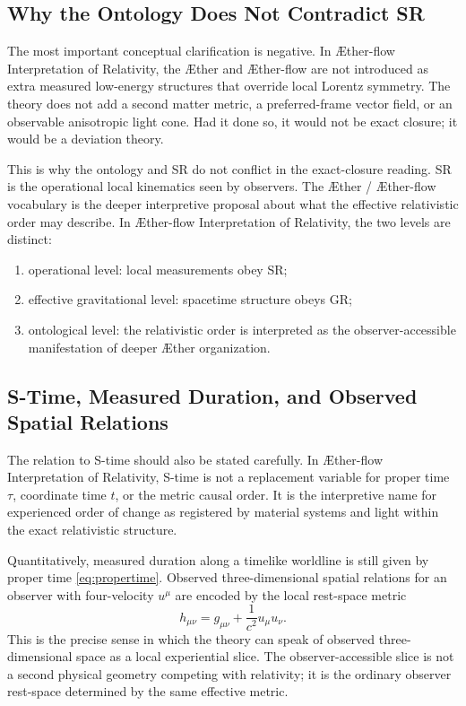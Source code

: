 \documentclass[11pt]{article}
\newcommand{\Aether}{\AE{}ther}
\newcommand{\Aflow}{\AE{}ther-flow}
\newcommand{\TheoryName}{\Aflow{} Interpretation of Relativity}
\begin{document}
\subsection{Why the Ontology Does Not Contradict SR}

The most important conceptual clarification is negative. In \TheoryName{}, the \Aether{} and \Aflow{} are not introduced as extra measured low-energy structures that override local Lorentz symmetry. The theory does not add a second matter metric, a preferred-frame vector field, or an observable anisotropic light cone. Had it done so, it would not be exact closure; it would be a deviation theory.

This is why the ontology and SR do not conflict in the exact-closure reading. SR is the operational local kinematics seen by observers. The \Aether{} / \Aflow{} vocabulary is the deeper interpretive proposal about what the effective relativistic order may describe. In \TheoryName{}, the two levels are distinct:
\begin{enumerate}
    \item operational level: local measurements obey SR;
    \item effective gravitational level: spacetime structure obeys GR;
    \item ontological level: the relativistic order is interpreted as the observer-accessible manifestation of deeper \Aether{} organization.
\end{enumerate}

\subsection{S-Time, Measured Duration, and Observed Spatial Relations}

The relation to S-time should also be stated carefully. In \TheoryName{}, S-time is not a replacement variable for proper time \(\tau\), coordinate time \(t\), or the metric causal order. It is the interpretive name for experienced order of change as registered by material systems and light within the exact relativistic structure.

Quantitatively, measured duration along a timelike worldline is still given by proper time \eqref{eq:propertime}. Observed three-dimensional spatial relations for an observer with four-velocity \(u^\mu\) are encoded by the local rest-space metric
\begin{equation}
h_{\mu\nu}
=
g_{\mu\nu}
+
\frac{1}{c^2}u_\mu u_\nu.
\label{eq:spatialprojector}
\end{equation}
This is the precise sense in which the theory can speak of observed three-dimensional space as a local experiential slice. The observer-accessible slice is not a second physical geometry competing with relativity; it is the ordinary observer rest-space determined by the same effective metric.
\end{document}
